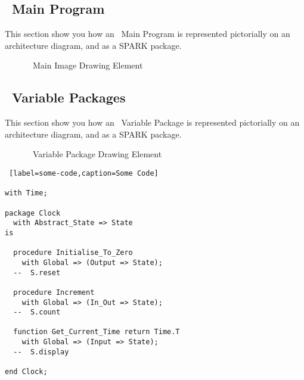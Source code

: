 \subsection{\informed\ Main Program}

This section show you how an \informed\ Main Program is represented pictorially on an architecture
diagram, and as a SPARK package.

\begin{figure}[h]
  \begin{center}
  \end{center}
  \caption{\informed\ Main Image Drawing Element}
\end{figure}

\subsection{\informed\ Variable Packages}

This section show you how an \informed\ Variable Package is represented pictorially on an architecture
diagram, and as a SPARK package.

\begin{figure}[h]
  \begin{center}
  \end{center}
  \caption{\informed\ Variable Package Drawing Element}
\end{figure}


\begin{lstlisting} [label=some-code,caption=Some Code]

with Time;

package Clock
  with Abstract_State => State
is

  procedure Initialise_To_Zero
    with Global => (Output => State);
  --  S.reset

  procedure Increment
    with Global => (In_Out => State);
  --  S.count

  function Get_Current_Time return Time.T
    with Global => (Input => State);
  --  S.display

end Clock;
\end{lstlisting}


